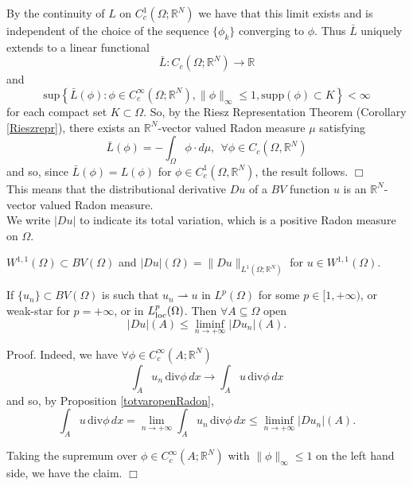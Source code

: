 By the continuity of $L$ on $C^{1}_{c}(\Omega ; \mathbb{R}^{N})$ we have that this limit exists and is independent of the choice of the sequence $\{ \phi_{k} \}$ converging to $\phi$. Thus $\bar L$ uniquely extends to a linear functional 
\[ \bar L : C_{c}(\Omega ; \mathbb{R}^{N}) \to \mathbb{R}  \]
and
\[ \mathrm{sup}\left \{ \bar L (\phi) : \phi \in C_{c}^{\infty}(\Omega ; \mathbb{R}^{N}), \|\phi\|_{\infty} \le 1, \mathrm{supp}(\phi) \subset K \right \} < \infty \]
for each compact set $K \subset \Omega$. So, by the Riesz Representation Theorem (Corollary \ref{Rieszrepr}), there exists an $\mathbb{R}^{N}$-vector valued Radon measure $\mu$ satisfying
\[ \bar L (\phi) = - \int_{\Omega} \phi \cdot d\mu,   \    \ \forall \phi \in C_{c}(\Omega,\mathbb{R}^{N}) \]
and so, since $\bar L (\phi) = L(\phi)$ for $\phi \in C^{1}_{c}(\Omega,\mathbb{R}^{N})$, the result follows. $\Box$ 
\\

This means that the distributional derivative $Du$ of a $BV$ function $u$ is an $\mathbb{R}^{N}$-vector valued Radon measure.
\\
We write $|Du|$ to indicate its total variation, which is a positive Radon measure on $\Omega$.


\begin{remark} $W^{1,1}(\Omega) \subset BV(\Omega)$ and $|Du|(\Omega) = \|Du\|_{L^{1}(\Omega; \mathbb{R}^{N})}$ for $u \in W^{1,1}(\Omega)$.
\end{remark}



\begin{theorem} \label{WLSCBV} If $\{u_{n}\} \subset BV(\Omega)$ is such that $u_{n} \rightharpoonup u$ in $L^{p}(\Omega)$ for some $p \in [1, +\infty)$, or weak-star for $p = +\infty$, or in $L^{p}_{\rm loc}(\Omega)$. Then $\forall A \subseteq \Omega$ open
\[ |Du|(A) \le \liminf\limits_{n \to +\infty} |Du_{n}|(A). \]
\end{theorem}
Proof. Indeed, we have $\forall \phi \in C_{c}^{\infty}(A; \mathbb{R}^{N})$
\[ \int_{A} u_{n}\, \mathrm{div}\phi\, dx \to \int_{A} u\, \mathrm{div}\phi\, dx \]
and so, by Proposition \ref{totvaropenRadon},
\[ \int_{A} u\, \mathrm{div}\phi\, dx = \lim_{n \to +\infty} \int_{A} u_{n}\, \mathrm{div}\phi\, dx \le \liminf\limits_{n \to +\infty} |Du_{n}|(A). \]

Taking the supremum over $\phi \in C_{c}^{\infty}(A; \mathbb{R}^{N})$ with $\|\phi\|_{\infty} \le 1$ on the left hand side, we have the claim. $\Box$



